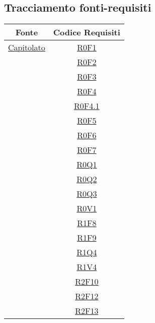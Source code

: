 \documentclass[../AnalisiDeiRequisiti.tex]{subfiles}
\begin{document}
\subsection{Tracciamento fonti-requisiti}
\normalsize
\begin{longtable}{|c|c|}
	\hline
	\textbf{Fonte} & \textbf{Codice Requisiti} \\
	\hline
	\endhead
	\hyperlink{Capitolato}{Capitolato} & \hyperlink{R0F1}{R0F1}\\& \hyperlink{R0F2}{R0F2}\\& \hyperlink{R0F3}{R0F3}\\& \hyperlink{R0F4}{R0F4}\\& \hyperlink{R0F4.1}{R0F4.1}\\& \hyperlink{R0F5}{R0F5}\\& \hyperlink{R0F6}{R0F6}\\& \hyperlink{R0F7}{R0F7}\\& \hyperlink{R0Q1}{R0Q1}\\& \hyperlink{R0Q2}{R0Q2}\\& \hyperlink{R0Q3}{R0Q3}\\& \hyperlink{R0V1}{R0V1}\\& \hyperlink{R1F8}{R1F8}\\& \hyperlink{R1F9}{R1F9}\\& \hyperlink{R1Q4}{R1Q4}\\& \hyperlink{R1V4}{R1V4}\\& \hyperlink{R2F10}{R2F10}\\& \hyperlink{R2F12}{R2F12}\\& \hyperlink{R2F13}{R2F13}\\\hline

\end{longtable}
\end{document}
